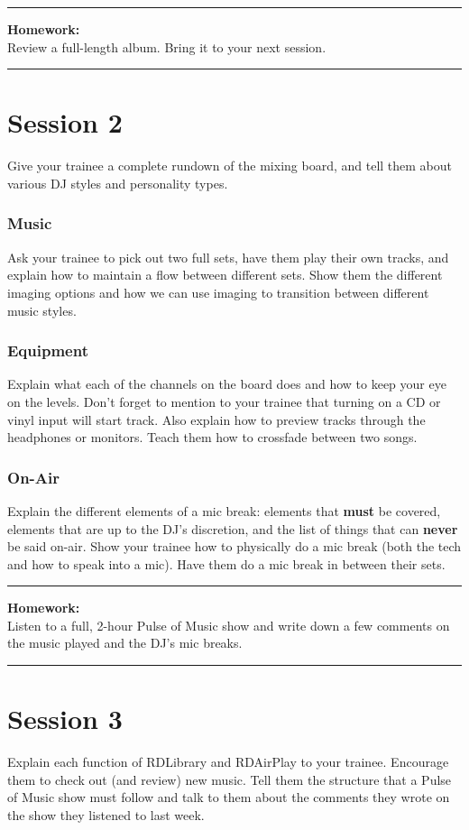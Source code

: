 \documentclass[]{witrman}
\newcommand{\makehomework}[1]{%
    \begin{samepage}
        \vspace{2pt}
        \rule{\textwidth}{1pt}
        \textbf{Homework:}\\
        #1\\
        \rule[3pt]{\textwidth}{1pt}
    \end{samepage}
}
\begin{document}
\makehomework{Review a full-length album.  Bring it to your next session.}


\chapter{Session 2}

Give your trainee a complete rundown of the mixing board, and tell them about
various DJ styles and personality types.

\subsection{Music}

Ask your trainee to pick out two full sets, have them play their own tracks, and
explain how to maintain a flow between different sets.  Show them the different
imaging options and how we can use imaging to transition between different music
styles.

\subsection{Equipment}

Explain what each of the channels on the board does and how to keep your eye on
the levels.  Don't forget to mention to your trainee that turning on a CD or
vinyl input will start track.  Also explain how to preview tracks through the
headphones or monitors.  Teach them how to crossfade between two songs.

\subsection{On-Air}

Explain the different elements of a mic break: elements that \textbf{must} be
covered, elements that are up to the DJ's discretion, and the list of things
that can \textbf{never} be said on-air.  Show your trainee how to physically do
a mic break (both the tech and how to speak into a mic).  Have them do a mic
break in between their sets.

\makehomework{Listen to a full, 2-hour Pulse of Music show and write down a few
comments on the music played and the DJ's mic breaks.}


\chapter{Session 3}

Explain each function of RDLibrary and RDAirPlay to your trainee.  Encourage
them to check out (and review) new music.  Tell them the structure that a Pulse
of Music show must follow and talk to them about the comments they wrote on the
show they listened to last week.
\end{document}
